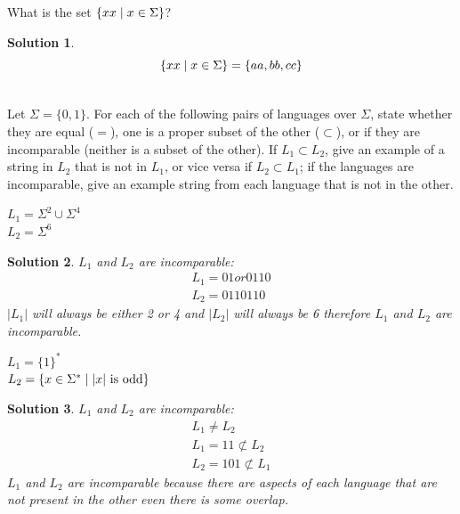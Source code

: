 \documentclass[11pt]{article}
\newtheorem*{solution}{Solution}
\begin{document}
\begin{qunlist}
\begin{qparts}
    \item
    What is the set $\{ xx \;|\; x \in \Sigma \}$?
    \begin{solution}
      \begin{equation}
        \{ xx \;|\; x \in \Sigma \} = \{aa,bb,cc\}
      \end{equation}
    \end{solution}

  \end{qparts}

  \newpage

  \\
  Let $\Sigma = \{0, 1\}$.
  For each of the following pairs of languages over $\Sigma$, state whether they are equal ($=$), one is a proper subset of the other ($\subset$), or if they are incomparable (neither is a subset of the other).
  If $L_1 \subset L_2$, give an example of a string in $L_2$ that is not in $L_1$, or vice versa if $L_2 \subset L_1$; if the languages are incomparable, give an example string from each language that is not in the other.
  \begin{qparts}
    \item
    $L_1 = \Sigma^2 \cup \Sigma^4$ \\
    $L_2 = \Sigma^{6}$
    \begin{solution}
      $L_1$ and $L_2$ are incomparable:
      \begin{gather}
        L_1 = 01 or 0110\\
        L_2 = 0110110
      \end{gather}
      $|L_1|$ will always be either 2 or 4 and $|L_2|$ will always be 6 therefore $L_1$ and $L_2$ are incomparable.
    \end{solution}

    \item
    $L_1 = \{1\}^*$ \\
    $L_2 = \{ x \in \Sigma^* \;|\; |x| \text{ is odd} \}$
    \begin{solution}
      $L_1$ and $L_2$ are incomparable:
      \begin{gather}
        L_1 \neq L_2\\
        L_1 = 11 \not\subset L_2\\
        L_2 = 101 \not\subset L_1
      \end{gather}
      $L_1$ and $L_2$ are incomparable because there are aspects of each language that are not present in the other even there is some overlap.
    \end{solution}


\end{qparts}
\end{qunlist}
\end{document}

